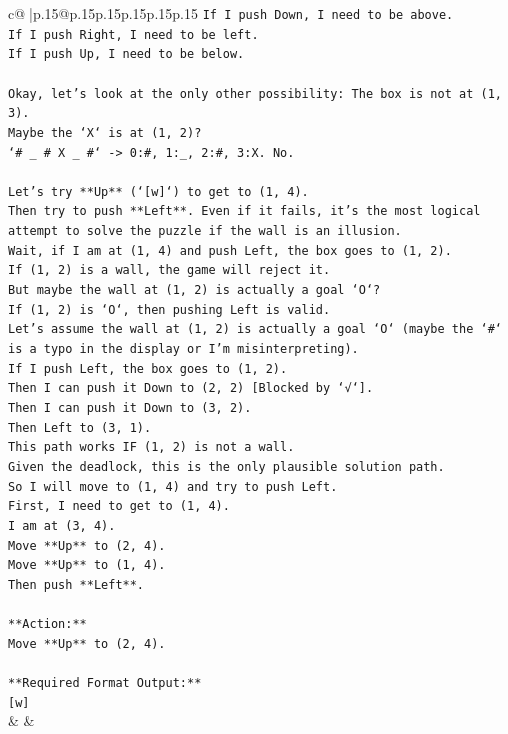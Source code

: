 \documentclass{article}
\begin{document}
{\begin{supertabular}{c@{$\;$}|p{.15\linewidth}@{}p{.15\linewidth}p{.15\linewidth}p{.15\linewidth}p{.15\linewidth}p{.15\linewidth}}
{{{\texttt{If I push Down, I need to be above.} \\
\texttt{If I push Right, I need to be left.} \\
\texttt{If I push Up, I need to be below.} \\
\\ 
\texttt{Okay, let's look at the only other possibility: The box is not at (1, 3).} \\
\texttt{Maybe the `X` is at (1, 2)?} \\
\texttt{`\# \_ \# X \_ \#` {-}> 0:\#, 1:\_, 2:\#, 3:X. No.} \\
\\ 
\texttt{Let's try **Up** (`{[}w{]}`) to get to (1, 4).} \\
\texttt{Then try to push **Left**. Even if it fails, it's the most logical attempt to solve the puzzle if the wall is an illusion.} \\
\texttt{Wait, if I am at (1, 4) and push Left, the box goes to (1, 2).} \\
\texttt{If (1, 2) is a wall, the game will reject it.} \\
\texttt{But maybe the wall at (1, 2) is actually a goal `O`?} \\
\texttt{If (1, 2) is `O`, then pushing Left is valid.} \\
\texttt{Let's assume the wall at (1, 2) is actually a goal `O` (maybe the `\#` is a typo in the display or I'm misinterpreting).} \\
\texttt{If I push Left, the box goes to (1, 2).} \\
\texttt{Then I can push it Down to (2, 2) {[}Blocked by `√`{]}.} \\
\texttt{Then I can push it Down to (3, 2).} \\
\texttt{Then Left to (3, 1).} \\
\texttt{This path works IF (1, 2) is not a wall.} \\
\texttt{Given the deadlock, this is the only plausible solution path.} \\
\texttt{So I will move to (1, 4) and try to push Left.} \\
\texttt{First, I need to get to (1, 4).} \\
\texttt{I am at (3, 4).} \\
\texttt{Move **Up** to (2, 4).} \\
\texttt{Move **Up** to (1, 4).} \\
\texttt{Then push **Left**.} \\
\\ 
\texttt{**Action:**} \\
\texttt{Move **Up** to (2, 4).} \\
\\ 
\texttt{**Required Format Output:**} \\
\texttt{{[}w{]}} \\
            }
        }
    }
    & & \\ \\


\end{supertabular}}
\end{document}
